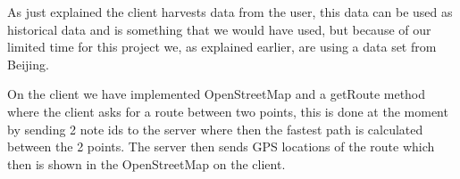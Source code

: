 As just explained the client harvests data from the user, this data can be used as historical data and is something that we would have used, but because of our limited time for this project we, as explained earlier, are using a data set from Beijing.

On the client we have implemented OpenStreetMap and a getRoute method where the client asks for a route between two points, this is done at the moment by sending 2 note ids to the server where then the fastest path is calculated between the 2 points. The server then sends GPS locations of the route which then is shown in the OpenStreetMap on the client. 		
